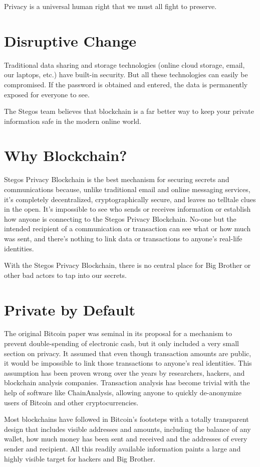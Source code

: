 \documentclass[8pt,fleqn,openany]{book}
\begin{document}
Privacy is a universal human right that we must all fight to preserve.
  
\section{Disruptive Change}
Traditional data sharing and storage technologies (online cloud storage, email, our laptops, etc.) have built-in security. But all these technologies can easily be compromised. If the password is obtained and entered, the data is permanently exposed for everyone to see.

The Stegos team believes that blockchain is a far better way to keep your private information safe in the modern online world.

\section{Why Blockchain?}
Stegos Privacy Blockchain is the best mechanism for securing secrets and communications because, unlike traditional email and online messaging services, it’s completely decentralized, cryptographically secure, and leaves no telltale clues in the open. It’s impossible to see who sends or receives information or establish how anyone is connecting to the Stegos Privacy Blockchain. No-one but the intended recipient of a communication or transaction can see what or how much was sent, and there’s nothing to link data or transactions to anyone’s real-life identities.

With the Stegos Privacy Blockchain, there is no central place for Big Brother or other bad actors to tap into our secrets.

\section{Private by Default}
The original Bitcoin paper was seminal in its proposal for a mechanism to prevent double-spending of electronic cash, but it only included a very small section on privacy. It assumed that even though transaction amounts are public, it would be impossible to link those transactions to anyone’s real identities. This assumption has been proven wrong over the years by researchers, hackers, and blockchain analysis companies. Transaction analysis has become trivial with the help of software like ChainAnalysis, allowing anyone to quickly de-anonymize users of Bitcoin and other cryptocurrencies.

Most blockchains have followed in Bitcoin’s footsteps with a totally transparent design that includes visible addresses and amounts, including the balance of any wallet, how much money has been sent and received and the addresses of every sender and recipient. All this readily available information paints a large and highly visible target for hackers and Big Brother.
\end{document}
